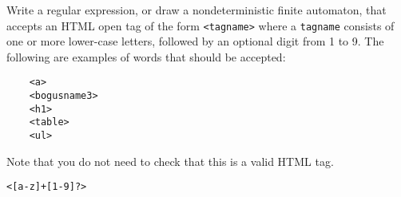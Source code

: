 \documentclass[10pt]{article}
\begin{document}
Write a regular expression,
or draw a nondeterministic finite automaton,
that accepts an HTML open tag of the form
\verb|<tagname>|
where a \verb|tagname| consists
of one or more lower-case letters,
followed by an optional digit from 1 to 9.
The following are examples of words that should be accepted:
\begin{verbatim}
    <a>
    <bogusname3>
    <h1>
    <table>
    <ul>
\end{verbatim}
Note that you do not need to check that this is a valid HTML tag.

\begin{Verbatim}[frame=single]
	<[a-z]+[1-9]?>
\end{Verbatim}
\end{document}
